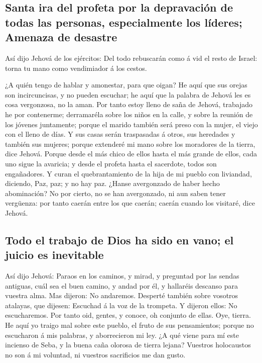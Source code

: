 \hypertarget{santa-ira-del-profeta-por-la-depravaciuxf3n-de-todas-las-personas-especialmente-los-luxedderes-amenaza-de-desastre}{%
\subsection{Santa ira del profeta por la depravación de todas las
personas, especialmente los líderes; Amenaza de
desastre}\label{santa-ira-del-profeta-por-la-depravaciuxf3n-de-todas-las-personas-especialmente-los-luxedderes-amenaza-de-desastre}}

 Así dijo Jehová de los ejércitos: Del todo rebuscarán
como á vid el resto de Israel: torna tu mano como vendimiador á los
cestos.

 ¿A quién tengo de hablar y amonestar, para que oigan? He
aquí que sus orejas son incircuncisas, y no pueden escuchar; he aquí que
la palabra de Jehová les es cosa vergonzosa, no la aman. 
Por tanto estoy lleno de saña de Jehová, trabajado he por contenerme;
derramaréla sobre los niños en la calle, y sobre la reunión de los
jóvenes juntamente; porque el marido también será preso con la mujer, el
viejo con el lleno de días.  Y sus casas serán
traspasadas á otros, sus heredades y también sus mujeres; porque
extenderé mi mano sobre los moradores de la tierra, dice Jehová.
 Porque desde el más chico de ellos hasta el más grande
de ellos, cada uno sigue la avaricia; y desde el profeta hasta el
sacerdote, todos son engañadores.  Y curan el
quebrantamiento de la hija de mi pueblo con liviandad, diciendo, Paz,
paz; y no hay paz.  ¿Hanse avergonzado de haber hecho
abominación? No por cierto, no se han avergonzado, ni aun saben tener
vergüenza: por tanto caerán entre los que caerán; caerán cuando los
visitaré, dice Jehová.

\hypertarget{todo-el-trabajo-de-dios-ha-sido-en-vano-el-juicio-es-inevitable}{%
\subsection{Todo el trabajo de Dios ha sido en vano; el juicio es
inevitable}\label{todo-el-trabajo-de-dios-ha-sido-en-vano-el-juicio-es-inevitable}}

 Así dijo Jehová: Paraos en los caminos, y mirad, y
preguntad por las sendas antiguas, cuál sea el buen camino, y andad por
él, y hallaréis descanso para vuestra alma. Mas dijeron: No andaremos.
 Desperté también sobre vosotros atalayas, que dijesen:
Escuchad á la voz de la trompeta. Y dijeron ellos: No escucharemos.
 Por tanto oid, gentes, y conoce, oh conjunto de ellas.
 Oye, tierra. He aquí yo traigo mal sobre este pueblo, el
fruto de sus pensamientos; porque no escucharon á mis palabras, y
aborrecieron mi ley.  ¿A qué viene para mí este incienso
de Seba, y la buena caña olorosa de tierra lejana? Vuestros holocaustos
no son á mi voluntad, ni vuestros sacrificios me dan gusto.

